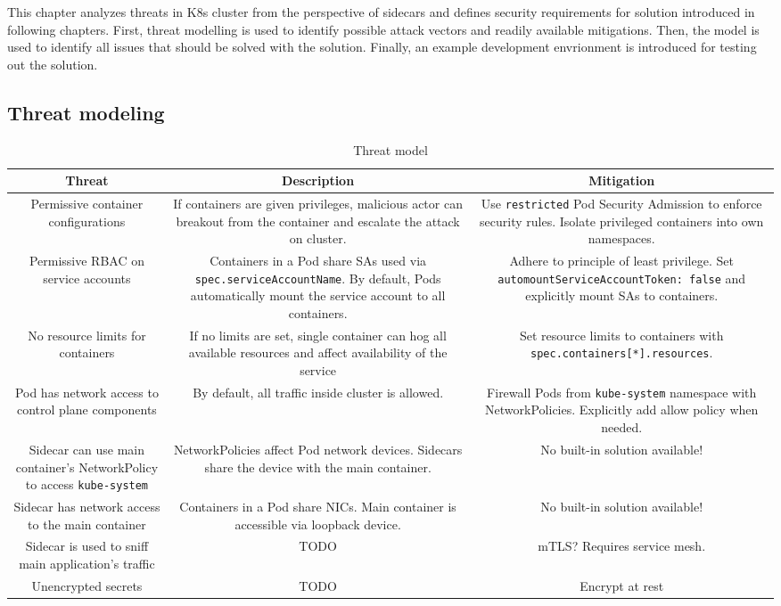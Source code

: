 \documentclass[english, 12pt, a4paper, sci, utf8, a-2b, online]{aaltothesis}
\begin{document}
This chapter analyzes threats in K8s cluster from the perspective of sidecars and defines security requirements for solution introduced in following chapters. First, threat modelling is used to identify possible attack vectors and readily available mitigations. Then, the model is used to identify all issues that should be solved with the solution. Finally, an example development envrionment is introduced for testing out the solution.

\subsection{Threat modeling}

\begin{table}[H]
  \centering
  \caption{Threat model}
  \label{table:threat-model}
  \sffamily%
  \begin{tabularx}{\textwidth}{CCC}
    \hline
    \textbf{Threat} & \textbf{Description} & \textbf{Mitigation}\\ \hline
    Permissive container configurations & If containers are given privileges, malicious actor can breakout from the container and escalate the attack on cluster. & Use \texttt{restricted} Pod Security Admission to enforce security rules. Isolate privileged containers into own namespaces. \\ \hline
    Permissive RBAC on service accounts & Containers in a Pod share SAs used via \texttt{spec.serviceAccountName}. By default, Pods automatically mount the service account to all containers. & Adhere to principle of least privilege. Set \texttt{automountServiceAccountToken: false} and explicitly mount SAs to containers. \\ \hline
    No resource limits for containers & If no limits are set, single container can hog all available resources and affect availability of the service & Set resource limits to containers with \texttt{spec.containers[*].resources}. \\ \hline
    Pod has network access to control plane components & By default, all traffic inside cluster is allowed. & Firewall Pods from \texttt{kube-system} namespace with NetworkPolicies. Explicitly add allow policy when needed. \\ \hline
    Sidecar can use main container's NetworkPolicy to access \texttt{kube-system} & NetworkPolicies affect Pod network devices. Sidecars share the device with the main container. & No built-in solution available! \\ \hline
    Sidecar has network access to the main container & Containers in a Pod share NICs. Main container is accessible via loopback device. & No built-in solution available! \\ \hline
    Sidecar is used to sniff main application's traffic & TODO & mTLS? Requires service mesh. \\ \hline
    Unencrypted secrets & TODO & Encrypt at rest \\ \hline
  \end{tabularx}
\end{table}
\end{document}

